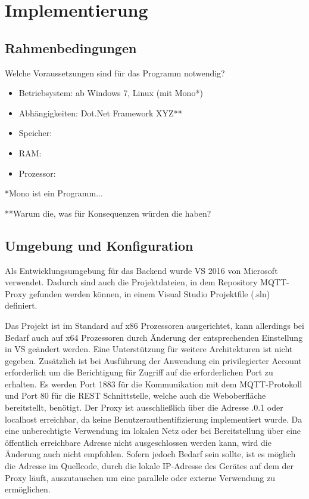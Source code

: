 \chapter{Implementierung}
\section{Rahmenbedingungen}
    Welche Voraussetzungen sind für das Programm notwendig?
    \begin{itemize}
        \item Betriebsystem: ab Windows 7, Linux (mit Mono*)
        \item Abhängigkeiten: Dot.Net Framework XYZ**
        \item Speicher: 
        \item RAM: 
        \item Prozessor: 
    \end{itemize}
    
    *Mono ist ein Programm...
    
    **Warum die, was für Konsequenzen würden die haben?

\section{Umgebung und Konfiguration} %
    Als Entwicklungsumgebung für das Backend wurde \ac{VS} 2016 %
    von Microsoft verwendet. Dadurch sind auch die Projektdateien, in dem Repository \glqq MQTT-Proxy\grqq{} %
    gefunden werden können, in einem Visual Studio Projektfile (.sln) definiert.
    
    Das Projekt ist im Standard auf x86 Prozessoren ausgerichtet, kann allerdings bei Bedarf auch auf x64 Prozessoren durch Änderung der entsprechenden Einstellung in \ac{VS} geändert werden.
    Eine Unterstützung für weitere Architekturen ist nicht gegeben.
    Zusätzlich ist bei Ausführung der Anwendung ein privilegierter Account erforderlich um die Berichtigung für Zugriff auf die erforderlichen Port zu erhalten.
    Es werden Port 1883 für die Kommunikation mit dem \ac{MQTT}-Protokoll und Port 80 für die \ac{REST} Schnittstelle, welche auch die Weboberfläche bereitstellt, benötigt.
    Der Proxy ist ausschließlich über die Adresse .0.1\grqq{} oder \glqq localhost\grqq{} erreichbar, da keine Benutzerauthentifizierung implementiert wurde. Da eine unberechtigte Verwendung im lokalen Netz oder bei Bereitstellung über eine öffentlich erreichbare Adresse nicht ausgeschlossen werden kann, wird die Änderung auch nicht empfohlen. Sofern jedoch Bedarf sein sollte, ist es möglich die Adresse im Quellcode, durch die lokale IP-Adresse des Gerätes auf dem der Proxy läuft, auszutauschen um eine parallele oder externe Verwendung zu ermöglichen.
    
